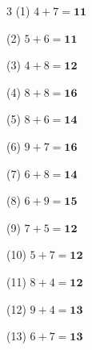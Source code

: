 \documentclass[a4paper, 11pt]{ltjsarticle}
\begin{document}
\hfill

\vspace*{2ex}

\vspace*{5ex}

\begin{multicols*}{3}
\noindent (1) \quad $4 + 7 = \mathbf{11}$
\vspace*{\fill}

\noindent (2) \quad $5 + 6 = \mathbf{11}$
\vspace*{\fill}

\noindent (3) \quad $4 + 8 = \mathbf{12}$
\vspace*{\fill}

\noindent (4) \quad $8 + 8 = \mathbf{16}$
\vspace*{\fill}

\noindent (5) \quad $8 + 6 = \mathbf{14}$
\vspace*{\fill}

\noindent (6) \quad $9 + 7 = \mathbf{16}$
\vspace*{\fill}

\noindent (7) \quad $6 + 8 = \mathbf{14}$
\vspace*{\fill}

\noindent (8) \quad $6 + 9 = \mathbf{15}$
\vspace*{\fill}

\noindent (9) \quad $7 + 5 = \mathbf{12}$
\vspace*{\fill}

\noindent (10) \quad $5 + 7 = \mathbf{12}$
\vspace*{\fill}

\noindent (11) \quad $8 + 4 = \mathbf{12}$
\vspace*{\fill}

\noindent (12) \quad $9 + 4 = \mathbf{13}$
\vspace*{\fill}
\columnbreak

\noindent (13) \quad $6 + 7 = \mathbf{13}$
\vspace*{\fill}


\end{multicols*}
\end{document}
